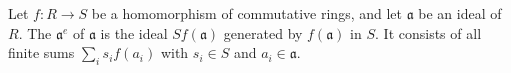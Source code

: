 Let $f : R \to S$ be a homomorphism of commutative rings, and let $\mathfrak{a}$ be an ideal of $R$. The  $\mathfrak{a}^e$ of $\mathfrak{a}$ is the ideal $S f(\mathfrak{a})$ generated by $f(\mathfrak{a})$ in $S$. It consists of all finite sums $\sum_i s_i f(a_i)$ with $s_i \in S$ and $a_i \in \mathfrak{a}$.
